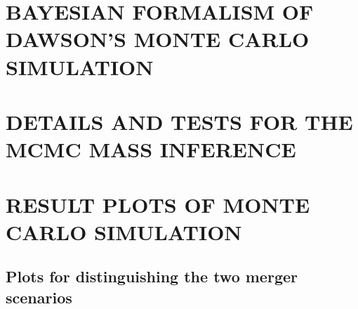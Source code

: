 \section{BAYESIAN FORMALISM OF DAWSON'S MONTE CARLO SIMULATION}


\section{DETAILS AND TESTS FOR THE MCMC MASS INFERENCE}\label{app:MCMC}


\section{RESULT PLOTS OF MONTE CARLO SIMULATION} \label{app: plots}

\subsection{Plots for distinguishing the two merger scenarios}
\label{app: merger_scenarios}

\bsp 
\label{lastpage} 

